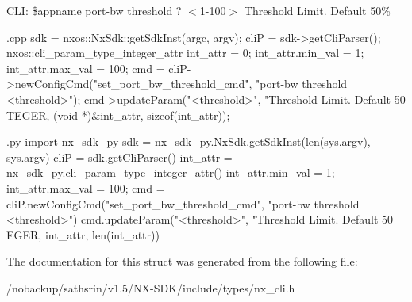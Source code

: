 CLI: \$appname port-\/bw threshold ? $<$1-\/100$>$ Threshold Limit. Default 50\%


\begin{DoxyCode}
 {.cpp}
       sdk = nxos::NxSdk::getSdkInst(argc, argv);
       cliP = sdk->getCliParser();
       nxos::cli_param_type_integer_attr int_attr = {0};
       int_attr.min_val = 1;
       int_attr.max_val = 100;
       cmd = cliP->newConfigCmd("set_port_bw_threshold_cmd",
                                "port-bw threshold <threshold>");
       cmd->updateParam("<threshold>", "Threshold Limit. Default 50%
      TEGER,
                        (void *)&int_attr, sizeof(int_attr));
\end{DoxyCode}



\begin{DoxyCode}
 {.py}
       import nx_sdk_py
       sdk = nx_sdk_py.NxSdk.getSdkInst(len(sys.argv), sys.argv)
       cliP = sdk.getCliParser()
       int_attr = nx_sdk_py.cli_param_type_integer_attr()
       int_attr.min_val = 1;
       int_attr.max_val = 100;
       cmd = cliP.newConfigCmd("set_port_bw_threshold_cmd", 
                               "port-bw threshold <threshold>")
       cmd.updateParam("<threshold>", "Threshold Limit. Default 50%
      EGER,
                       int_attr, len(int_attr))
\end{DoxyCode}
 

The documentation for this struct was generated from the following file:\begin{DoxyCompactItemize}
\item 
/nobackup/sathsrin/v1.5/NX-\/SDK/include/types/nx\_\-cli.h\end{DoxyCompactItemize}
